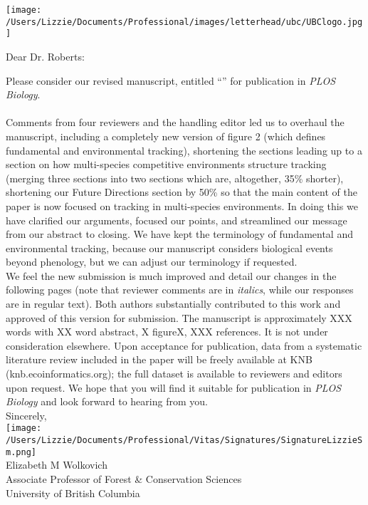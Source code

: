 \documentclass[11pt,a4paper]{letter}
\begin{document}
\begin{letter}{}
\texttt{[image: /Users/Lizzie/Documents/Professional/images/letterhead/ubc/UBClogo.jpg]}\\
\opening{Dear Dr. Roberts:}
Please consider our revised manuscript, entitled ``'' for publication in \emph{PLOS Biology}. 
\vspace{1.5ex}\\

\vspace{1.5ex}\\
Comments from four reviewers and the handling editor led us to overhaul the manuscript, including a completely new version of figure 2 (which defines fundamental and environmental tracking), shortening the sections leading up to a section on how multi-species competitive environments structure tracking (merging three sections into two sections which are, altogether, 35\% shorter), shortening our Future Directions section by 50\% so that the main content of the paper is now focused on tracking in multi-species environments. In doing this we have clarified our arguments, focused our points, and streamlined our message from our abstract to closing. We have kept the terminology of fundamental and environmental tracking, because our manuscript considers biological events beyond phenology, but we can adjust our terminology if requested. 
\vspace{1.5ex}\\
We feel the new submission is much improved and detail our changes in the following pages (note that reviewer comments are in \emph{italics}, while our responses are in regular text). Both authors substantially contributed to this work and approved of this version for submission. The manuscript is approximately XXX words with XX word abstract, X figureX,  XXX references. It is not under consideration elsewhere. Upon acceptance for publication, data from a systematic literature review included in the paper will be freely available at KNB (knb.ecoinformatics.org); the full dataset is available to reviewers and editors upon request. We hope that you will find it suitable for publication in \emph{PLOS Biology} and look forward to hearing from you.
\vspace{1.5ex}\\
Sincerely,\\

\texttt{[image: /Users/Lizzie/Documents/Professional/Vitas/Signatures/SignatureLizzieSm.png]} \\

Elizabeth M Wolkovich\\
Associate Professor of Forest \& Conservation Sciences\\ 
University of British Columbia
\end{letter}
\end{document}

